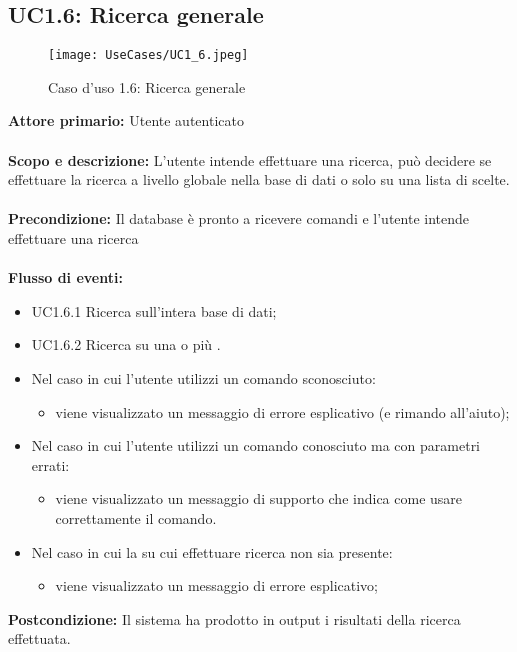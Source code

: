 \documentclass{scalatekids-article}
\begin{document}
\subsection{UC1.6: Ricerca generale}
\begin{figure}[H]
  \begin{center}
    \texttt{[image: UseCases/UC1\_6.jpeg]}
    \caption{Caso d'uso 1.6: Ricerca generale}
  \end{center}
\end{figure}
\textbf{Attore primario:} Utente autenticato \\ \\
\textbf{Scopo e descrizione:} L’utente intende effettuare una ricerca, può decidere se effettuare la ricerca a livello globale nella base di dati o solo su una lista di  scelte.\\ \\
\textbf{Precondizione:} Il database è pronto a ricevere comandi e l’utente intende effettuare una ricerca\\ \\
\textbf{Flusso di eventi:}
\begin{itemize}
\item UC1.6.1 Ricerca sull'intera base di dati;
\item UC1.6.2 Ricerca su una o più .
\end{itemize}
\begin{itemize}
\item Nel caso in cui l'utente utilizzi un comando sconosciuto:
  \begin{itemize}
  \item viene visualizzato un messaggio di errore esplicativo (e rimando all'aiuto);
  \end{itemize}
\item Nel caso in cui l'utente utilizzi un comando conosciuto ma con parametri errati:
  \begin{itemize}
  \item viene visualizzato un messaggio di supporto che indica come usare correttamente il comando.
  \end{itemize}
\item Nel caso in cui la  su cui effettuare ricerca non sia presente:
  \begin{itemize}
  \item viene visualizzato un messaggio di errore esplicativo;
  \end{itemize}
\end{itemize}
\textbf{Postcondizione:} Il sistema ha prodotto in output i risultati della ricerca effettuata.
\end{document}
